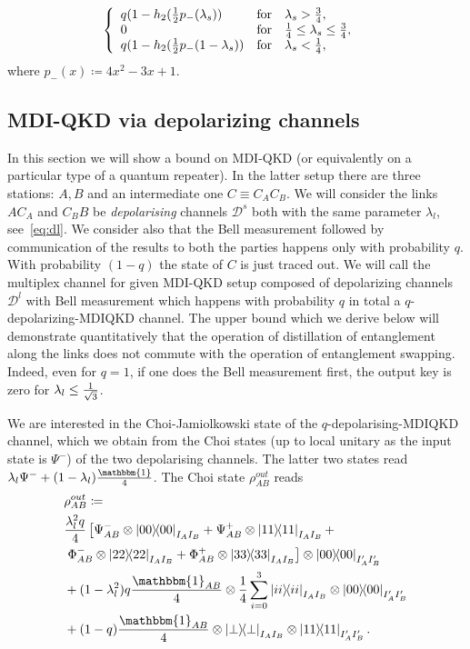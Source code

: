 \documentclass[aps,pra,twocolumn,superscriptaddress,longbibliography]{revtex4-1}
\newcommand{\mc}[1]{\mathcal{#1}}
\newcommand{\bbm}[1]{\mathbbm{#1}}
\begin{document}
\begin{appendix}
\begin{enumerate}
\begin{align}
& \left\{
\begin{array}{ll}
q(1- h_2({1\over 2}p_-(\lambda_s)) & \textnormal{for}\quad \lambda_s > \frac{3}{4},\\
0 & \textnormal{for}\quad \frac{1}{4}\leq \lambda_s\leq \frac{3}{4},\\
q(1- h_2({1\over 2}p_-(1-\lambda_s)) & \textnormal{for}\quad \lambda_s< \frac{1}{4},\\
\end{array}
\right.
\end{align}
where $p_-(x)\coloneqq 4x^2-3x +1$.
    \end{enumerate}
    
\subsection{MDI-QKD via depolarizing channels}
In this section we will show a bound on MDI-QKD (or equivalently on a particular type of a quantum repeater). In the latter setup there are three stations: $A,B$ and an intermediate one $C\equiv C_AC_B$. We will consider the links $AC_A$ and $C_BB$ be {\it depolarising } channels $\mc{D}^s$ both with the same parameter $\lambda_l$, see~\eqref{eq:dl}. We consider also that the Bell measurement followed by communication of the results to both the parties happens only with probability $q$. With probability $(1-q)$ the state of $C$ is just traced out. We will call the multiplex channel for given MDI-QKD setup composed of depolarizing channels $\mc{D}^l$ with Bell measurement which happens with probability $q$ in total a $q$-depolarizing-MDIQKD channel. The upper bound which we derive below will demonstrate quantitatively that the operation of distillation of entanglement along the links does not commute with the operation of entanglement swapping. Indeed, even for $q=1$, if one does the Bell measurement first, the output key is zero for $\lambda_l\leq {1\over \sqrt{3}}$.

We are interested in the Choi-Jamiolkowski state of the $q$-depolarising-MDIQKD channel, which we obtain from the Choi states (up to local unitary as the input state is $\Psi^-$) of the two depolarising channels. The latter two states read $\lambda_l \Psi^- + (1-\lambda_l){\bbm{1} \over 4}$. The Choi state $\rho_{AB}^{out}$ reads
\begin{align}
& \rho_{AB}^{out} \coloneqq \nonumber\\
& {\lambda_l^2 q\over 4}\left[\Psi^-_{AB}\otimes \op{00}_{I_AI_B} +\Psi^+_{AB}\otimes\op{11}_{I_AI_B}+\right.\nonumber\\
&\left. \Phi^-_{AB}\otimes\op{22}_{I_AI_B}+ \Phi^+_{AB}\otimes\op{33}_{I_AI_B}\right]\otimes \op{00}_{I'_AI'_B}  \nonumber\\
&+ (1-\lambda_l^2) q {\bbm{1}_{AB}\over 4}\otimes {1\over 4}\sum_{i=0}^{3}\op{ii}_{I_AI_B} \otimes \op{00}_{I'_AI'_B} \nonumber \\ 
& + (1-q) {\bbm{1}_{AB}\over 4}\otimes \op{\perp}_{I_AI_B}\otimes \op{11}_{I'_AI'_B}.
\end{align} 


\end{appendix}
\end{document}
